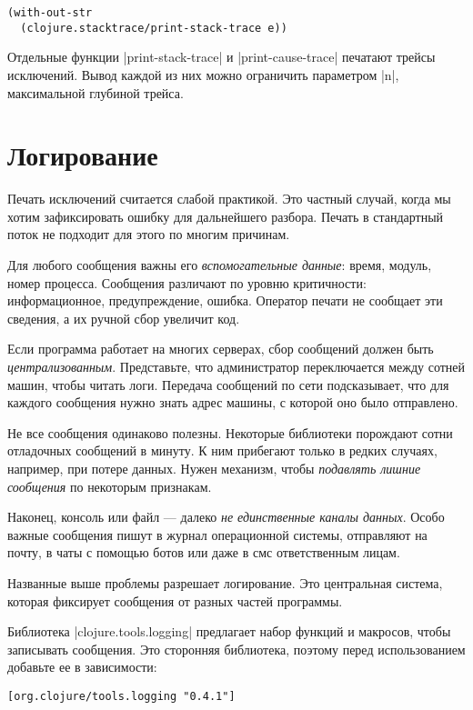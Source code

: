 \begin{verbatim}
(with-out-str
  (clojure.stacktrace/print-stack-trace e))
\end{verbatim}

Отдельные функции \spverb|print-stack-trace| и \spverb|print-cause-trace| печатают трейсы
исключений. Вывод каждой из них можно ограничить параметром \spverb|n|, максимальной
глубиной трейса.

\section{Логирование}

Печать исключений считается слабой практикой. Это частный случай, когда мы хотим
зафиксировать ошибку для дальнейшего разбора. Печать в стандартный поток не
подходит для этого по многим причинам.

Для любого сообщения важны его \emph{вспомогательные данные}: время, модуль, номер
процесса. Сообщения различают по уровню критичности: информационное,
предупреждение, ошибка. Оператор печати не сообщает эти сведения, а их ручной
сбор увеличит код.

Если программа работает на многих серверах, сбор сообщений должен быть
\emph{централизованным}. Представьте, что администратор переключается между сотней
машин, чтобы читать логи. Передача сообщений по сети подсказывает, что для
каждого сообщения нужно знать адрес машины, с которой оно было отправлено.

Не все сообщения одинаково полезны. Некоторые библиотеки порождают сотни
отладочных сообщений в минуту. К ним прибегают только в редких случаях,
например, при потере данных. Нужен механизм, чтобы \emph{подавлять лишние
сообщения} по некоторым признакам.

Наконец, консоль или файл — далеко \emph{не единственные каналы данных}. Особо
важные сообщения пишут в журнал операционной системы, отправляют на почту, в
чаты с помощью ботов или даже в смс ответственным лицам.

Названные выше проблемы разрешает логирование. Это центральная система, которая
фиксирует сообщения от разных частей программы.

Библиотека \spverb|clojure.tools.logging| предлагает набор функций и макросов, чтобы
записывать сообщения. Это сторонняя библиотека, поэтому перед использованием
добавьте ее в зависимости:

\begin{verbatim}
[org.clojure/tools.logging "0.4.1"]
\end{verbatim}

